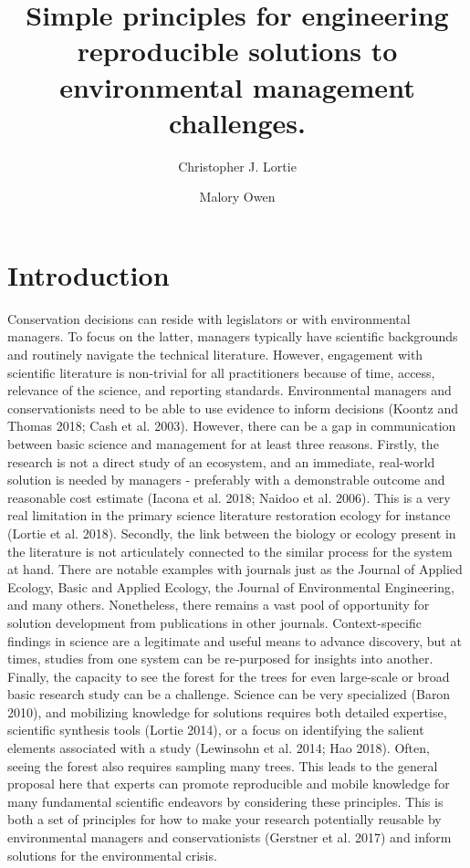 \documentclass[fleqn,10pt]{wlpeerj} %
\title{Simple principles for engineering reproducible solutions to
environmental management challenges.}
\author[1]{Christopher J. Lortie}
\author[1]{Malory Owen}
\affil[1]{Biology, York University, 4700 Keele St.~Toronto, ON, Canada, M3J1P3}
\begin{document}
\flushbottom
\maketitle
\thispagestyle{empty}

\section*{Introduction}\label{introduction}

Conservation decisions can reside with legislators or with environmental
managers. To focus on the latter, managers typically have scientific
backgrounds and routinely navigate the technical literature. However,
engagement with scientific literature is non-trivial for all
practitioners because of time, access, relevance of the science, and
reporting standards. Environmental managers and conservationists need to
be able to use evidence to inform decisions (Koontz and Thomas 2018;
Cash et al. 2003). However, there can be a gap in communication between
basic science and management for at least three reasons. Firstly, the
research is not a direct study of an ecosystem, and an immediate,
real-world solution is needed by managers - preferably with a
demonstrable outcome and reasonable cost estimate (Iacona et al. 2018;
Naidoo et al. 2006). This is a very real limitation in the primary
science literature restoration ecology for instance (Lortie et al.
2018). Secondly, the link between the biology or ecology present in the
literature is not articulately connected to the similar process for the
system at hand. There are notable examples with journals just as the
Journal of Applied Ecology, Basic and Applied Ecology, the Journal of
Environmental Engineering, and many others. Nonetheless, there remains a
vast pool of opportunity for solution development from publications in
other journals. Context-specific findings in science are a legitimate
and useful means to advance discovery, but at times, studies from one
system can be re-purposed for insights into another. Finally, the
capacity to see the forest for the trees for even large-scale or broad
basic research study can be a challenge. Science can be very specialized
(Baron 2010), and mobilizing knowledge for solutions requires both
detailed expertise, scientific synthesis tools (Lortie 2014), or a focus
on identifying the salient elements associated with a study (Lewinsohn
et al. 2014; Hao 2018). Often, seeing the forest also requires sampling
many trees. This leads to the general proposal here that experts can
promote reproducible and mobile knowledge for many fundamental
scientific endeavors by considering these principles. This is both a set
of principles for how to make your research potentially reusable by
environmental managers and conservationists (Gerstner et al. 2017) and
inform solutions for the environmental crisis.
\end{document}
